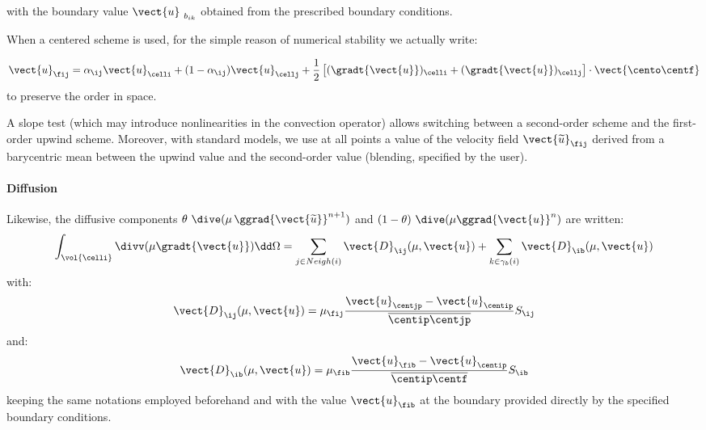 with the boundary value ${\vect{u}_{\ {b}_{ik}}}$ obtained from the prescribed
boundary conditions.

\begin{remark}
When a centered scheme is used, for the simple reason of numerical stability
we actually write:

\begin{equation*}
\vect{u}_{\fij} = \alpha_{\ij} \vect{u}_{\celli} +  (1-\alpha_{\ij})
\vect{u}_{\cellj} +
\frac{1}{2}\left[(\gradt{\vect{u}})_\celli + (\gradt{\vect{u}})_\cellj \right] \cdot \vect{\cento \centf}
\end{equation*}
to preserve the order in space.
\end{remark}

\begin{remark}
A slope test (which may introduce nonlinearities in the convection operator)
allows switching between a second-order scheme and the first-order upwind scheme.
Moreover, with standard models, we use at all points a value of the velocity field
$\vect{\widetilde{u}}_{\fij}$ derived from a barycentric mean between the upwind
value and the second-order value (blending, specified by the user).
\end{remark}

\paragraph{Diffusion\\}
Likewise, the diffusive components $\theta\,\,\dive(\mu\,\ggrad{\vect{\widetilde{u}}}^{n+1})$ and $(1-\theta)\,\,\dive(\mu \ggrad{\vect{u}}^{n})$ are written:
\begin{equation*}
\int_{\vol{\celli}}{\divv(\mu \gradt{\vect{u}}) \dd \Omega} =
\sum_{j\in Neigh(i)}{\vect{D}_{\ij}(\mu, \vect{u})}
+\sum_{k\in {\gamma_b(i)}} {\vect{D}_{\ib}}(\mu,\vect{u})
\end{equation*}
with:
\begin{equation}
\vect{D}_{\ij}(\mu, \vect{u}) = \mu_{\fij}
\frac{\vect{u}_{\centjp}-\vect{u}_{\centip}}{ \overline{\centip \centjp}} S_{\ij}
\end{equation}
and:
\begin{equation}
\vect{D}_{\ib}(\mu, \vect{u}) = \mu_{\fib}
\dfrac{\vect{u}_{\fib}-\vect{u}_{\centip}}{\overline{\centip \centf}} S_{\ib}
\end{equation}
keeping the same notations employed beforehand and with the value
${\vect{u}_{\fib}}$ at the boundary provided directly by the specified
boundary conditions.

